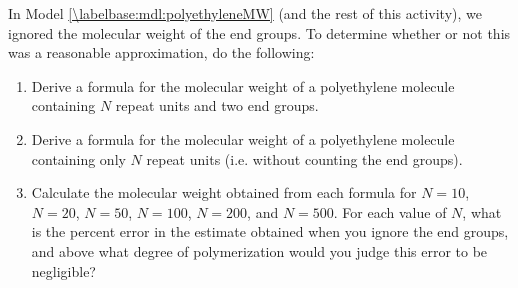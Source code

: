 \begin{activity}
\begin{exercises}
	\exercise In Model \ref{\labelbase:mdl:polyethyleneMW} (and the rest of this activity), we ignored the molecular weight of the end groups.  To determine whether or not this was a reasonable approximation, do the following:
	
		\begin{enumerate}
			
			\item Derive a formula for the molecular weight of a polyethylene molecule containing $N$  repeat units and two  end groups.
			
				\begin{solution}\end{solution}
			
			\item Derive a formula for the molecular weight of a polyethylene molecule containing only $N$  repeat units (i.e. without counting the end groups).
			
				\begin{solution}\end{solution}
			
			\item Calculate the molecular weight obtained from each formula for $N=10$, $N=20$, $N=50$, $N=100$, $N=200$, and $N=500$. For each value of $N$, what is the percent error in the estimate obtained when you ignore the end groups, and above what degree of polymerization would you judge this error to be negligible?
			
				\begin{solution}
\end{solution}
\end{enumerate}
\end{exercises}
\end{activity}
